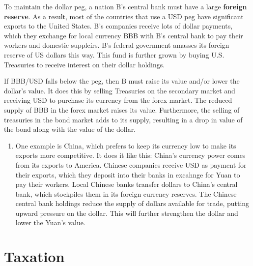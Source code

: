 \documentclass{article}
\begin{document}
    To maintain the dollar peg, a nation B's central bank must have a large \textbf{foreign reserve}. As a result, most of the countries that use a USD peg have significant exports to the United States. B's companies receive lots of dollar payments, which they exchange for local currency BBB with B's central bank to pay their workers and domestic suppleirs. B's federal government amasses its foreign reserve of US dollars this way. This fund is further grown by buying U.S. Treasuries to receive interest on their dollar holdings.

    \begin{center}
    \end{center}

    If BBB/USD falls below the peg, then B must raise its value and/or lower the dollar's value. It does this by selling Treasuries on the secondary market and receiving USD to purchase its currency from the forex market. The reduced supply of BBB in the forex market raises its value. Furthermore, the selling of treasuries in the bond market adds to its supply, resulting in a drop in value of the bond along with the value of the dollar.

    \begin{center}
    \end{center}

    \begin{enumerate}
      \item One example is China, which prefers to keep its currency low to make its exports more competitive. It does it like this: China's currency power comes from its exports to America. Chinese companies receive USD as payment for their exports, which they deposit into their banks in excahnge for Yuan to pay their workers. Local Chinese banks transfer dollars to China's central bank, which stockpiles them in its foreign currency reserves. The Chinese central bank holdings reduce the supply of dollars available for trade, putting upward pressure on the dollar. This will further strengthen the dollar and lower the Yuan's value.
    \end{enumerate}

\section{Taxation}
\end{document}
